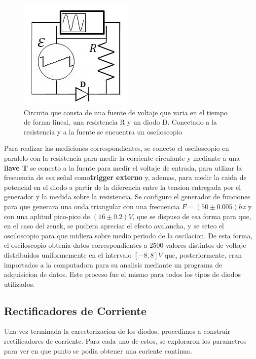\documentclass[11pt,a4paper]{article}
\begin{document}
\begin{figure}[H]
\centering
\includegraphics[scale=0.8]{Caracterizar-Diodo}
   \caption{Circuito que consta de una fuente de voltaje que varia en el tiempo de forma lineal, una resistencia R y un diodo D. Conectado a la resistencia y a la fuente se encuentra un osciloscopio}
   \label{fig:Car-Dio}
\end{figure}

Para realizar las mediciones correspondientes, se conecto el osciloscopio en paralelo con la resistencia para medir la corriente circulante y mediante a una \textbf{llave T} se conecto a la fuente para medir el voltaje de entrada, para utlizar la frecuencia de esa señal como\textbf{trigger externo} y, ademas, para medir la caida de potencial en el diodo a partir de la diferencia entre la tension entregada por el generador y la medida sobre la resistencia. Se configuro el generador de funciones para que generara una onda triangular con una frecuencia  $F = (50 \pm 0.005)hz$ y con una aplitud pico-pico de $(16 \pm 0.2)V$, que se dispuso de esa forma para que, en el caso del zenek, se pudiera apreciar el efecto avalancha, y se seteo el osciloscopio para que midiera sobre medio periodo de la oscilacion. De esta forma, el osciloscopio obtenia datos correspondientes a 2500 valores distintos de voltaje distribuidos uniformemente en el intervalo $[-8,8]V$ que, posteriormente, eran importados a la computadora para su analisis  mediante un programa de adquisicion de datos. Este proceso fue el mismo para todos los tipos de diodos utilizados.

\subsection{Rectificadores de Corriente}
Una vez terminada la carecterizacion de los diodos, procedimos a construir rectificadores de corriente. Para cada uno de estos, se exploraron los parametros para ver en que punto se podia obtener una coriente continua.
\end{document}
